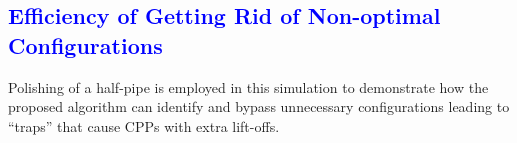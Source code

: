 \documentclass[journal]{IEEEtran}
\begin{document}



\textcolor{blue}{\subsection{Efficiency of Getting Rid of Non-optimal Configurations}
\label{sec:cyl_sim_examples}
}
Polishing of a half-pipe is employed in this simulation to demonstrate how the proposed algorithm can identify and bypass unnecessary configurations leading to ``traps'' that cause CPPs with extra lift-offs. 
\end{document}
